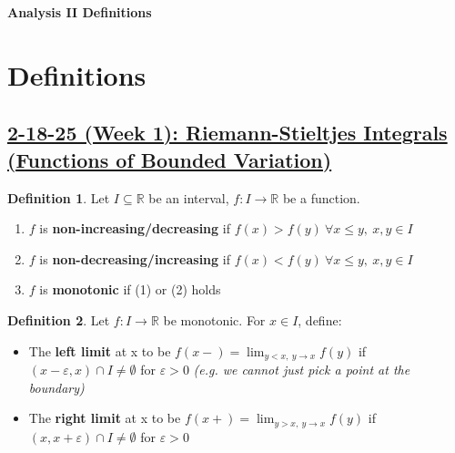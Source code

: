 \documentclass[12pt,a4paper]{article}
\theoremstyle{definition}
\newtheorem{definition}{Definition}[subsection]
\begin{document}
\begin{center}
  {\Large \bf Analysis II Definitions}\\[6pt]
\end{center}

\section*{Definitions}
\setcounter{definition}{0}
\subsection*{\underline{\textbf{2-18-25 (Week 1): Riemann-Stieltjes Integrals (Functions of Bounded Variation)}}}
\begin{definition}
  Let $I \subseteq \mathbb{R}$ be an interval, $f: I \rightarrow \mathbb{R}$ be a function.
  \begin{enumerate} [(1)]
    \item $f$ is \textbf{non-increasing/decreasing} if $f(x) > f(y) \ \forall x \leq y, \ x, y \in I$
    \item $f$ is \textbf{non-decreasing/increasing} if $f(x) < f(y) \ \forall x \leq y, \ x, y \in I$
    \item $f$ is \textbf{monotonic} if (1) or (2) holds
  \end{enumerate}
\end{definition}
\vspace{0.125em}

\begin{definition}
  Let $f: I \rightarrow \mathbb{R}$ be monotonic.
  For $x \in I$, define:
  \begin{itemize}
    \item The \textbf{left limit} at x to be \underline{$f(x-) = \lim_{y < x, \ y \rightarrow x} f(y)$} if $(x - \varepsilon, x) \cap I \neq \emptyset$ for $\varepsilon > 0$ \textit{(e.g. we cannot just pick a point at the boundary)}
    \item The \textbf{right limit} at x to be \underline{$f(x+) = \lim_{y > x, \ y \rightarrow x} f(y)$} if $(x, x + \varepsilon) \cap I \neq \emptyset$ for $\varepsilon > 0$
  \end{itemize}
\end{definition}
\vspace{0.125em}
\end{document}
